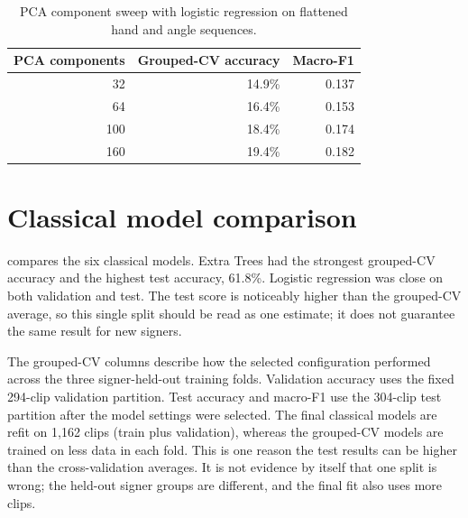 \documentclass[12pt,a4paper,oneside]{report}
\begin{document}
\begin{table}[H]
\centering
\label{tab:pca}
\begin{tabular}{rrr}
\toprule
PCA components & Grouped-CV accuracy & Macro-F1 \\
\midrule
32 & 14.9\% & 0.137 \\
64 & 16.4\% & 0.153 \\
100 & 18.4\% & 0.174 \\
160 & 19.4\% & 0.182 \\
\bottomrule
\end{tabular}
\caption{PCA component sweep with logistic regression on flattened hand and angle sequences.}
\end{table}

\section{Classical model comparison}
 compares the six classical models. Extra Trees had the strongest grouped-CV accuracy and the highest test accuracy, 61.8\%. Logistic regression was close on both validation and test. The test score is noticeably higher than the grouped-CV average, so this single split should be read as one estimate; it does not guarantee the same result for new signers.

\begin{table}[H]
\centering
\label{tab:classical}
\small
{}
\caption{Classical model performance. Cross-validation is three-fold and signer-grouped.}
\end{table}

The grouped-CV columns describe how the selected configuration performed across the three signer-held-out training folds. Validation accuracy uses the fixed 294-clip validation partition. Test accuracy and macro-F1 use the 304-clip test partition after the model settings were selected. The final classical models are refit on 1,162 clips (train plus validation), whereas the grouped-CV models are trained on less data in each fold. This is one reason the test results can be higher than the cross-validation averages. It is not evidence by itself that one split is wrong; the held-out signer groups are different, and the final fit also uses more clips.
\end{document}
